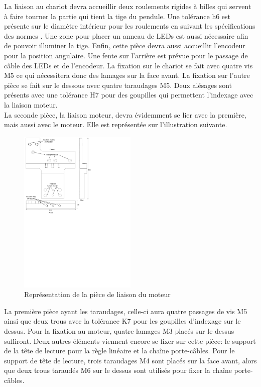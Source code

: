 La liaison au chariot devra accueillir deux roulements rigides à billes qui servent à faire tourner la partie qui tient la tige du pendule. Une tolérance
h6 est présente sur le diamètre intérieur pour les roulements en suivant les spécifications des normes \cite{Ajustements}. Une zone pour placer
un anneau de LEDs est aussi nécessaire afin de pouvoir illuminer la tige. Enfin, cette pièce devra aussi accueillir l'encodeur pour la position
angulaire. Une fente sur l'arrière est prévue pour le passage de câble des LEDs et de l'encodeur. La fixation sur le chariot se fait avec quatre
vis M5 ce qui nécessitera donc des lamages sur la face avant. La fixation sur l'autre pièce se fait sur le dessous avec quatre taraudages M5.
Deux alésages sont présents avec une tolérance H7 pour des goupilles qui permettent l'indexage avec la liaison moteur.\\

La seconde pièce, la liaison moteur, devra évidemment se lier avec la première, mais aussi avec le moteur. Elle est représentée sur l'illustration
suivante.

\begin{figure}[H]
    \centering
    \includegraphics[width = 0.5\textwidth]{assets/figures/LiaisonMoteur.svg}
    \caption{Représentation de la pièce de liaison du moteur}
    \label{fig:LiaisonMoteur}
\end{figure}

La première pièce ayant les taraudages, celle-ci aura quatre passages de vis M5 ainsi que deux trous avec la tolérance K7 pour les goupilles d'indexage
sur le dessus.
Pour la fixation au moteur, quatre lamages M3 placés sur le dessus suffiront. Deux autres éléments viennent encore se fixer sur cette pièce: le support de la tête de
lecture pour la règle linéaire et la chaîne porte-câbles. Pour le support de tête de lecture, trois taraudages M4 sont placés sur la face avant, alors
que deux trous taraudés M6 sur le dessus sont utilisés pour fixer la chaîne porte-câbles.

